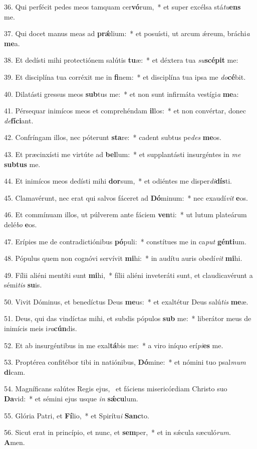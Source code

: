 36. Qui perfécit pedes meos tamquam cer\textbf{vó}rum,~*  et super excélsa stá\textit{tu}\textbf{ens} me.\

37. Qui docet manus meas ad \textbf{prǽ}lium:~*  et posuísti, ut arcum ǽreum, bráchi\textit{a} \textbf{me}a.\

38. Et dedísti mihi protectiónem salútis \textbf{tu}æ:~*  et déxtera tua \textit{su}\textbf{scé}\textbf{pit} me:\

39. Et disciplína tua corréxit me in \textbf{fi}nem:~*  et disciplína tua ipsa me \textit{do}\textbf{cé}bit.\

40. Dilatásti gressus meos \textbf{sub}tus me:~*  et non sunt infirmáta vestígi\textit{a} \textbf{me}a:\

41. Pérsequar inimícos meos et comprehéndam \textbf{il}los:~*  et non convértar, donec \textit{de}\textbf{fí}\textbf{ci}ant.\

42. Confríngam illos, nec póterunt \textbf{sta}re:~*  cadent subtus pe\textit{des} \textbf{me}os.\

43. Et præcinxísti me virtúte ad \textbf{bel}lum:~*  et supplantásti insurgéntes in \textit{me} \textbf{sub}\textbf{tus} me.\

44. Et inimícos meos dedísti mihi \textbf{dor}sum,~*  et odiéntes me disper\textit{di}\textbf{dís}ti.\

45. Clamavérunt, nec erat qui salvos fáceret ad \textbf{Dó}minum:~*  nec exaudí\textit{vit} \textbf{e}os.\

46. Et commínuam illos, ut púlverem ante fáciem \textbf{ven}ti:~*  ut lutum plateárum delé\textit{bo} \textbf{e}os.\

47. Erípies me de contradictiónibus \textbf{pó}puli:~*  constítues me in ca\textit{put} \textbf{gén}\textbf{ti}um.\

48. Pópulus quem non cognóvi servívit \textbf{mi}hi:~*  in audítu auris obedí\textit{vit} \textbf{mi}hi.\

49. Fílii aliéni mentíti sunt \textbf{mi}hi,~*  fílii aliéni inveteráti sunt, et claudicavérunt a sémi\textit{tis} \textbf{su}is.\

50. Vivit Dóminus, et benedíctus Deus \textbf{me}us:~*  et exaltétur Deus salú\textit{tis} \textbf{me}æ.\

51. Deus, qui das vindíctas mihi, et subdis pópulos \textbf{sub} me:~*  liberátor meus de inimícis meis i\textit{ra}\textbf{cún}dis.\

52. Et ab insurgéntibus in me exal\textbf{tá}bis me:~*  a viro iníquo erí\textit{pi}\textbf{es} me.\

53. Proptérea confitébor tibi in natiónibus, \textbf{Dó}mine:~*  et nómini tuo psal\textit{mum} \textbf{di}cam.\

54. Magníficans salútes Regis ejus, \dag\  et fáciens misericórdiam Christo suo \textbf{Da}vid:~*  et sémini ejus usque \textit{in} \textbf{sǽ}\textbf{cu}lum.\

55. Glória Patri, et \textbf{Fí}lio,~*  et Spirítu\textit{i} \textbf{Sanc}to.\

56. Sicut erat in princípio, et nunc, et \textbf{sem}per,~*  et in sǽcula sæculó\textit{rum}. \textbf{A}men.\

